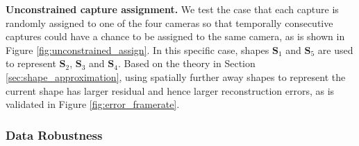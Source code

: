 \textbf{Unconstrained capture assignment.}
We test the case that each capture is randomly assigned to one of the four cameras so that temporally consecutive captures could have a chance to be assigned to the same camera, as is shown in Figure \ref{fig:unconstrained_assign}. In this specific case, shapes $\mathbf{S}_1$ and $\mathbf{S}_5$ are used to represent $\mathbf{S}_2$, $\mathbf{S}_3$ and $\mathbf{S}_4$. Based on the theory in Section \ref{sec:shape_approximation}, using spatially further away shapes to represent the current shape has larger residual and hence larger reconstruction errors, as is validated in Figure \ref{fig:error_framerate}.
 
\subsubsection{Data Robustness}

